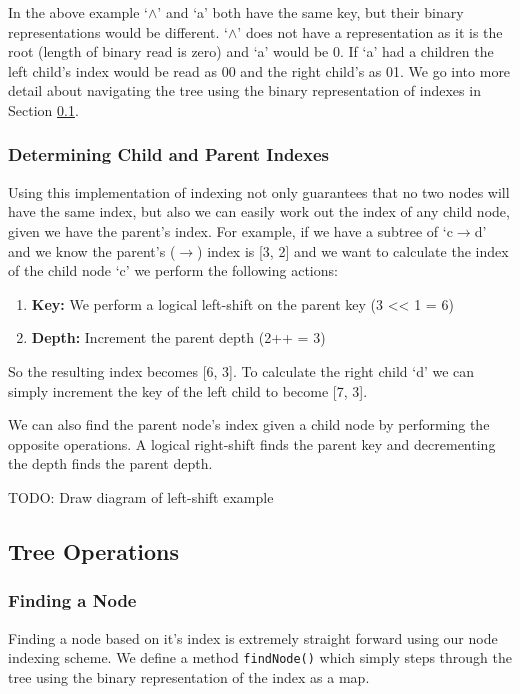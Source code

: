 \documentclass{report}
\begin{document}
In the above example `$\land$' and `a' both have the same key, but their binary representations would be different. `$\land$' does not have a representation as it is the root (length of binary read is zero) and `a' would be 0. If `a' had a children the left child's index would be read as 00 and the right child's as 01. We go into more detail about navigating the tree using the binary representation of indexes in Section \ref{sub:tree_operations}.

\subsubsection{Determining Child and Parent Indexes}

Using this implementation of indexing not only guarantees that no two nodes will have the same index, but also we can easily work out the index of any child node, given we have the parent's index. For example, if we have a subtree of `c$\to$d' and we know the parent's ($\to$) index is [3, 2] and we want to calculate the index of the child node `c' we perform the following actions:

\begin{enumerate}
    \item \textbf{Key:} We perform a logical left-shift on the parent key (3 << 1 = 6)
    \item \textbf{Depth:} Increment the parent depth (2++ = 3)
\end{enumerate}

So the resulting index becomes [6, 3]. To calculate the right child `d' we can simply increment the key of the left child to become [7, 3].

We can also find the parent node's index given a child node by performing the opposite operations. A logical right-shift finds the parent key and decrementing the depth finds the parent depth.

TODO: Draw diagram of left-shift example

\subsection{Tree Operations}
\label{sub:tree_operations}

\subsubsection{Finding a Node}

Finding a node based on it's index is extremely straight forward using our node indexing scheme. We define a method {\tt findNode()} which simply steps through the tree using the binary representation of the index as a map.
\end{document}
